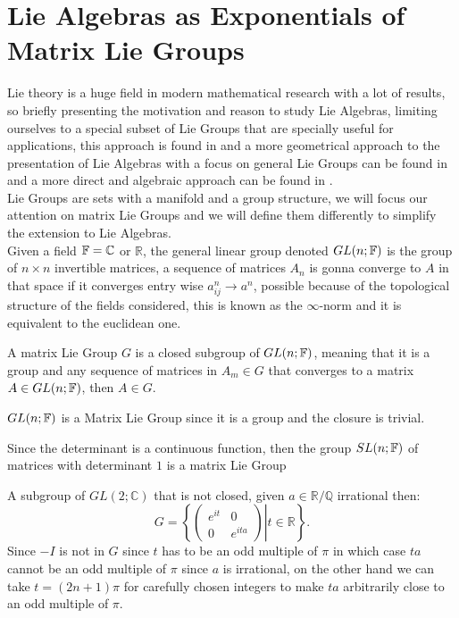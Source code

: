 \section{Lie Algebras as Exponentials of Matrix Lie Groups}
Lie theory is a huge field in modern mathematical research with a lot of results, so briefly presenting the motivation and reason to study Lie Algebras, limiting ourselves to a special subset of Lie Groups that are specially useful for applications, this approach is found in \cite{brian} and a more geometrical approach to the presentation of Lie Algebras with a focus on general Lie Groups can be found in \cite{kirillov} and a more direct and algebraic approach can be found in \cite{kac}.\\
Lie Groups are sets with a manifold and a group structure, we will focus our attention on matrix Lie Groups and we will define them differently to simplify the extension to Lie Algebras.\\
Given a field $\mathbb{F}=\mathbb{C}$ or $\mathbb{R}$, the general linear group denoted $GL(n;\mathbb{F})$ is the group of $n\times n$ invertible matrices, a sequence of matrices $A_n$ is gonna converge to $A$ in that space if it converges entry wise $a^n_{ij} \rightarrow a^n$, possible because of the topological structure of the fields considered, this is known as the $\infty$-norm and it is equivalent to the euclidean one.
\begin{defi}
	A matrix Lie Group $G$ is a closed subgroup of $GL(n;\mathbb{F})$, meaning that it is a group and any sequence of matrices in $A_m \in G$ that converges to a matrix $A \in GL(n;\mathbb{F})$, then $A \in G$.
	\label{MATRIXLIEGROUPDEF}
\end{defi}
\begin{ex}
	$GL(n;\mathbb{F})$ is a Matrix Lie Group since it is a group and the closure is trivial.
\end{ex}
\begin{ex}
Since the determinant is a continuous function, then the group $SL(n;\mathbb{F})$ of matrices with determinant $1$ is a matrix Lie Group
\end{ex}
\begin{ex}A subgroup of $GL(2;\mathbb{C})$ that is not closed, given $a\in \mathbb{R}/\mathbb{Q}$ irrational then:
		$$G=\left\{\left.\begin{pmatrix}
		e^{it} & 0 \\
		0 & e^{ita}	\end{pmatrix} \right| t \in \mathbb{R}\right\}.$$
		Since $-I$ is not in $G$ since $t$ has to be an odd multiple of $\pi$ in which case $ta$ cannot be an odd multiple of $\pi$ since $a$ is irrational, on the other hand we can take $t=(2n+1)\pi$ for carefully chosen integers to make $ta$ arbitrarily close to an odd multiple of $\pi$.\\
\end{ex}

